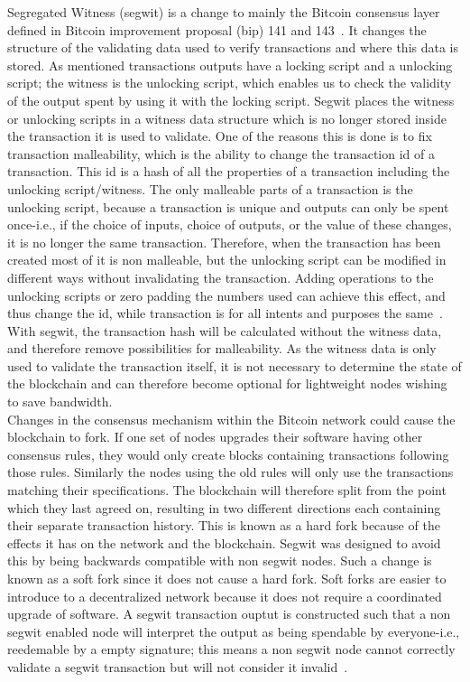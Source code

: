 Segregated Witness (segwit) is a change to mainly the Bitcoin consensus layer defined in Bitcoin improvement proposal (bip) 141 and 143~\cite{BIP141,BIP143}. It changes the structure of the validating data used to verify transactions and where this data is stored. As mentioned transactions outputs have a locking script and a unlocking script; the witness is the unlocking script, which enables us to check the validity of the output spent by using it with the locking script. Segwit places the witness or unlocking scripts in a witness data structure which is no longer stored inside the transaction it is used to validate. One of the reasons this is done is to fix transaction malleability, which is the ability to change the transaction id of a transaction. This id is a hash of all the properties of a transaction including the unlocking script/witness. The only malleable parts of a transaction is the unlocking script, because a transaction is unique and outputs can only be spent once-i.e., if the choice of inputs, choice of outputs, or the value of these changes, it is no longer the same transaction.
Therefore, when the transaction has been created most of it is non malleable, but the unlocking script can be modified in different ways without invalidating the transaction. Adding operations to the unlocking scripts or zero padding the numbers used can achieve this effect, and thus change the id, while transaction is for all intents and purposes the same~\cite{BIP62}. With segwit, the transaction hash will be calculated without the witness data, and therefore remove possibilities for malleability. As the witness data is only used to validate the transaction itself, it is not necessary to determine the state of the blockchain and can therefore become optional for lightweight nodes wishing to save bandwidth. 
\\

Changes in the consensus mechanism within the Bitcoin network could cause the blockchain to fork. If one set of nodes upgrades their software having other consensus rules, they would only create blocks containing transactions following those rules. Similarly the nodes using the old rules will only use the transactions matching their specifications. The blockchain will therefore split from the point which they last agreed on, resulting in two different directions each containing their separate transaction history. This is known as a hard fork because of the effects it has on the network and the blockchain. Segwit was designed to avoid this by being backwards compatible with non segwit nodes. Such a change is known as a soft fork since it does not cause a hard fork. Soft forks are easier to introduce to a decentralized network because it does not require a coordinated upgrade of software. A segwit transaction ouptut is constructed such that a non segwit enabled node will interpret the output as being spendable by everyone-i.e., reedemable by a empty signature; this means a non segwit node cannot correctly validate a segwit transaction but will not consider it invalid~\cite{antonopoulos2017mastering}. 
\\


